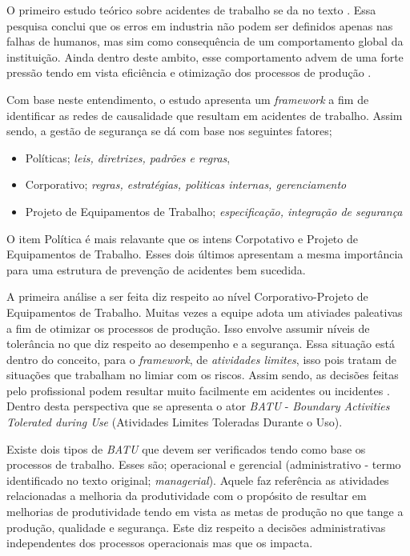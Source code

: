 
O primeiro estudo teórico sobre acidentes de trabalho se da no texto \cite{riskoldschool}. Essa pesquisa conclui que os erros em industria não podem ser definidos apenas nas falhas de 
humanos, mas sim como consequência de um comportamento global da instituição. Ainda dentro deste ambito, esse comportamento advem de uma forte pressão tendo em vista eficiência e otimização 
dos processos de produção \cite{riskoldschool} \cite{safety}.

Com base neste entendimento, o estudo \cite{safety} apresenta um \textit{framework} a fim de identificar as redes de causalidade que resultam em acidentes de trabalho. Assim sendo, a gestão de 
segurança se dá com base nos seguintes fatores; 
\begin{itemize}
    \item Políticas; \textit{leis, diretrizes, padrões e regras},
    \item Corporativo; \textit{regras, estratégias, politicas internas, gerenciamento}
    \item Projeto de Equipamentos de Trabalho; \textit{especificação, integração de segurança}
\end{itemize}

O item Política é mais relavante que os intens Corpotativo e Projeto de Equipamentos de Trabalho. Esses dois últimos apresentam a mesma importância para uma estrutura de prevenção de acidentes 
bem sucedida. 

A primeira análise a ser feita diz respeito ao nível Corporativo-Projeto de Equipamentos de Trabalho. Muitas vezes a equipe adota um ativiades paleativas a fim de otimizar os processos 
de produção. Isso envolve assumir níveis de tolerância no que diz respeito ao desempenho e a segurança. Essa situação está dentro do conceito, para o \textit{framework}, de \textit{atividades
limites}, isso pois tratam de situações que trabalham no limiar com os riscos. Assim sendo, as decisões feitas pelo profissional podem resultar muito facilmente em acidentes ou incidentes \cite{safety}. 
Dentro desta perspectiva que se apresenta o ator \textit{BATU} - \textit{Boundary Activities Tolerated during Use} (Atividades Limites Toleradas Durante o Uso).

Existe dois tipos de \textit{BATU} que devem ser verificados tendo como base os processos de trabalho. Esses são; operacional e gerencial (administrativo - termo identificado no texto 
original; \textit{managerial}). Aquele faz referência as atividades relacionadas a melhoria da produtividade com o propósito de resultar em melhorias de produtividade tendo em vista as metas
de produção no que tange a produção, qualidade e segurança. Este diz respeito a decisões administrativas independentes dos processos operacionais mas que os impacta.

